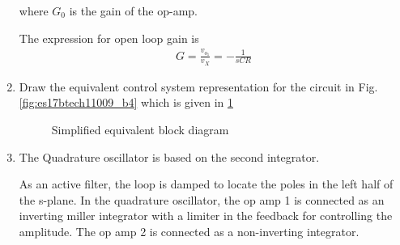 \begin{enumerate}[label=\arabic*.,ref=\theenumi]
where $G_{0}$ is the gain of the op-amp.

The expression for open loop gain is 
\begin{align}
    G = \frac{v_{o_1}}{v_{X}} = -\frac{1}{sCR}
    \label{eq:es17btech11009_G}
\end{align}

\item
Draw the equivalent control system representation for the circuit in Fig. \ref{fig:es17btech11009_b4} which is given in \ref{fig:es17btech11009_block}

\renewcommand{\thefigure}{\theenumi.\arabic{figure}}
\begin{figure}[!ht]
	\begin{center}
		\resizebox{\columnwidth}{!}{}
	\end{center}
\caption{Simplified equivalent block diagram}
\label{fig:es17btech11009_block}
\end{figure}
\item 
 The Quadrature oscillator is based on the second integrator.

As an active filter, the loop is damped to locate the poles in the left half of the s-plane. In the quadrature oscillator, the op amp 1 is connected as an inverting miller integrator with a limiter in the feedback for controlling the amplitude. The op amp 2 is connected as a non-inverting integrator.


\end{enumerate}
